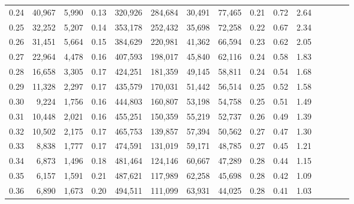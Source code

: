 \begin{tabular}{rrrcrrrrrrrrrrr}
0.24 &  40,967 &  5,990 &                                       0.13 &  320,926 &  284,684 &   30,491 &   77,465 &  0.21 &  0.72 &                         2.64 \\
0.25 &  32,252 &  5,207 &                                       0.14 &  353,178 &  252,432 &   35,698 &   72,258 &  0.22 &  0.67 &                         2.34 \\
0.26 &  31,451 &  5,664 &                                       0.15 &  384,629 &  220,981 &   41,362 &   66,594 &  0.23 &  0.62 &                         2.05 \\
0.27 &  22,964 &  4,478 &                                       0.16 &  407,593 &  198,017 &   45,840 &   62,116 &  0.24 &  0.58 &                         1.83 \\
0.28 &  16,658 &  3,305 &                                       0.17 &  424,251 &  181,359 &   49,145 &   58,811 &  0.24 &  0.54 &                         1.68 \\
0.29 &  11,328 &  2,297 &                                       0.17 &  435,579 &  170,031 &   51,442 &   56,514 &  0.25 &  0.52 &                         1.58 \\
0.30 &   9,224 &  1,756 &                                       0.16 &  444,803 &  160,807 &   53,198 &   54,758 &  0.25 &  0.51 &                         1.49 \\
0.31 &  10,448 &  2,021 &                                       0.16 &  455,251 &  150,359 &   55,219 &   52,737 &  0.26 &  0.49 &                         1.39 \\
0.32 &  10,502 &  2,175 &                                       0.17 &  465,753 &  139,857 &   57,394 &   50,562 &  0.27 &  0.47 &                         1.30 \\
0.33 &   8,838 &  1,777 &                                       0.17 &  474,591 &  131,019 &   59,171 &   48,785 &  0.27 &  0.45 &                         1.21 \\
0.34 &   6,873 &  1,496 &                                       0.18 &  481,464 &  124,146 &   60,667 &   47,289 &  0.28 &  0.44 &                         1.15 \\
0.35 &   6,157 &  1,591 &                                       0.21 &  487,621 &  117,989 &   62,258 &   45,698 &  0.28 &  0.42 &                         1.09 \\
0.36 &   6,890 &  1,673 &                                       0.20 &  494,511 &  111,099 &   63,931 &   44,025 &  0.28 &  0.41 &                         1.03 \\

\end{tabular}
